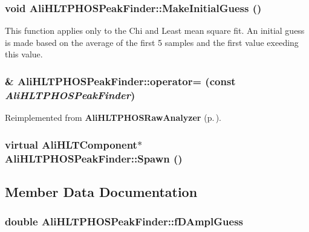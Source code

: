 \subsubsection{\setlength{\rightskip}{0pt plus 5cm}void Ali\-HLTPHOSPeak\-Finder::Make\-Initial\-Guess ()\hspace{0.3cm}{\tt  [private]}}\label{classAliHLTPHOSPeakFinder_d0}


This function applies only to the Chi and Least mean square fit. An initial guess is made based on the average of the first 5 samples and the first value exeeding this value. 
\subsubsection{\& Ali\-HLTPHOSPeak\-Finder::operator= (const  {\em Ali\-HLTPHOSPeak\-Finder})\hspace{0.3cm}{\tt  [inline]}}\label{classAliHLTPHOSPeakFinder_a3}




Reimplemented from {\bf Ali\-HLTPHOSRaw\-Analyzer} {\rm (p.\,\pageref{classAliHLTPHOSRawAnalyzer_a3})}.
\subsubsection{\setlength{\rightskip}{0pt plus 5cm}virtual Ali\-HLTComponent$\ast$ Ali\-HLTPHOSPeak\-Finder::Spawn ()\hspace{0.3cm}{\tt  [inline, virtual]}}\label{classAliHLTPHOSPeakFinder_a11}




\subsection{Member Data Documentation}
\subsubsection{\setlength{\rightskip}{0pt plus 5cm}double {\bf Ali\-HLTPHOSPeak\-Finder::f\-DAmpl\-Guess}\hspace{0.3cm}{\tt  [private]}}\label{classAliHLTPHOSPeakFinder_r1}


